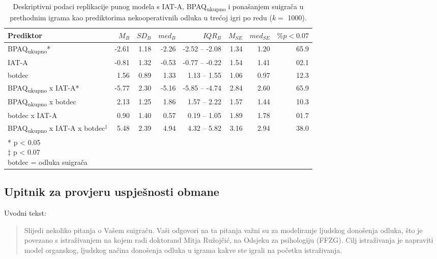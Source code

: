 \documentclass[a4paper, 12pt]{report}
\begin{document}
\begin{appendices}
\begin{table}
    \begin{center}
        \caption{\label{deskr gam3 robust} Deskriptivni podaci replikacije punog
            modela s IAT-A, BPAQ\textsubscript{ukupno} i ponašanjem suigrača u
            prethodnim igrama kao prediktorima nekooperativnih odluka u trećoj 
            igri po redu ($k =$ 1000).}
        \hspace*{-0.8cm}\begin{tabular}{lrrrrrrr}
        \toprule
        Prediktor & $M_B$ & $SD_B$ & $med_B$ & $IQR_B$ & $M_{SE}$ & $med_{SE}$
        & $\% p < 0.07$\\
        \midrule
        BPAQ\textsubscript{ukupno}* & -2.61 & 1.18 & -2.26 & -2.52 -- -2.08 &
        1.34 & 1.20 & 65.9\\
       IAT-A & -0.81 & 1.32 & -0.53 & -0.77 -- -0.22& 1.54 & 1.41 & 02.1\\
       botdec & 1.56 & 0.89 & 1.33 & 1.13 -- 1.55 & 1.06 & 0.97 & 12.3\\
       BPAQ\textsubscript{ukupno} x IAT-A* & -5.77 & 2.30 & -5.16 & -5.85 --
       -4.74& 2.84 & 2.60 & 65.9\\
       BPAQ\textsubscript{ukupno} x botdec & 2.13 & 1.25 & 1.86 &
        1.57 -- 2.22 & 1.57 & 1.44 & 10.3\\
       botdec x IAT-A & 0.90 & 1.40 & 0.57 & 0.19 -- 1.05& 1.89 & 1.78 & 01.7\\
       BPAQ\textsubscript{ukupno} x IAT-A x botdec$^\ddagger$ & 5.48 & 2.39 & 4.94 &
        4.32 -- 5.82& 3.16 & 2.94 & 38.0\\
        \bottomrule
        \multicolumn{5}{l}{
            \parbox{3cm}{\scriptsize \vspace{3pt} 
                * p < 0.05\\
                $\ddagger$  p < 0.07\\
                botdec = odluka suigrača
        }}
    \end{tabular}
\end{center}
\end{table}

\clearpage

\subsection{Upitnik za provjeru uspješnosti obmane}

Uvodni tekst:

\begin{quote}
    Slijedi nekoliko pitanja o Vašem suigraču. Vaši odgovori na ta pitanja važni
    su za modeliranje ljudskog donošenja odluka, što je povezano s istraživanjem
    na kojem radi doktorand Mitja Ružojčić, na Odsjeku za psihologiju (FFZG).
    Cilj istraživanja je napraviti model organskog, ljudskog načina donošenja
    odluka u igrama kakve ste igrali na početku istraživanja.


\end{quote}
\end{appendices}
\end{document}
